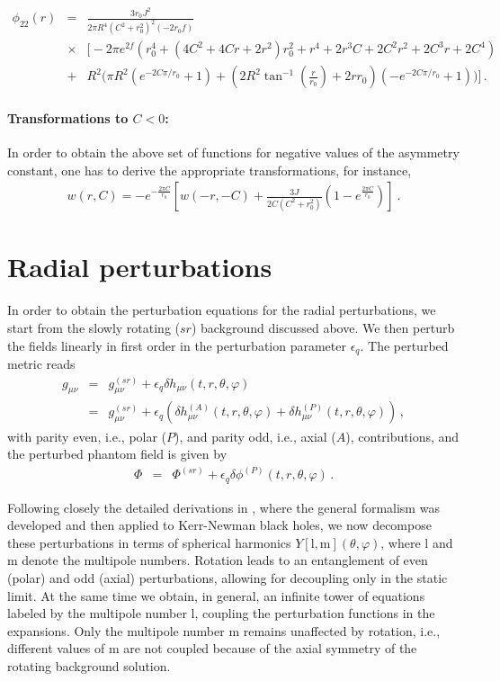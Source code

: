 \documentclass[aps,prd,12pt,superscriptaddress]{revtex4-2}
\begin{document}
\begin{eqnarray}
\phi_{22}(r) &=& \frac{3r_0J^2}{2 \pi
R^4 (C^2 + r_0^2)^2
(-2r_0f)} \nonumber\\
&\times&
\Big[ -2\pi e^{2f}
( r_0^4 + (4C^2 + 4Cr + 2r^2)r_0^2 + r^4 + 2r^3C + 2C^2r^2 + 2C^3r + 2C^4 )  \nonumber\\
&+& R^2 
\Big( 
 \pi R^2   (e^{-2C\pi/r_0} +1) 
+ (2R^2 \tan^{-1}(\frac{r}{r_0})  + 2rr_0)
(-e^{-2C\pi/r_0} +1)
\Big) \Big] \, .
\end{eqnarray}

\paragraph{Transformations to $C<0$:}
In order to obtain the above set of functions for negative values of the asymmetry constant, one has to derive the appropriate transformations, for instance,
\begin{eqnarray}
    w(r,C) = -e^{-\frac{2\pi C}{r_0}}
    \left[w(-r,-C) + \frac{3J}{2C(C^2+r_0^2)} (1-e^{\frac{2\pi C}{r_0}})\right] \ .
\end{eqnarray}


\section{Radial perturbations}

In order to obtain the perturbation equations for the radial perturbations, we start from the slowly rotating ($sr$) background discussed above.
We then perturb the fields linearly in first order in the perturbation parameter $\epsilon_q$.
The perturbed metric reads
\begin{eqnarray}
g_{\mu\nu} &=& g^{(sr)}_{\mu\nu} + \epsilon_q \delta h_{\mu\nu}(t,r,\theta,{\varphi}) \nonumber \\
 &=& g^{(sr)}_{\mu\nu} + \epsilon_q 
\left( \delta h^{(A)}_{\mu\nu}(t,r,\theta,{\varphi}) 
    +  \delta h^{(P)}_{\mu\nu}(t,r,\theta,{\varphi}) \right)
\, , 
\label{per_m}
\end{eqnarray}
with parity even, i.e., polar ($P$), and parity odd, i.e., axial ($A$), contributions, and the perturbed phantom field is given by
\begin{eqnarray}
\Phi &=& {\Phi}^{(sr)} + \epsilon_q \delta{\phi}^{(P)} (t,r,\theta,{\varphi})
\label{per_p}
\, .
\end{eqnarray}

Following closely the detailed derivations in \cite{Blazquez-Salcedo:2022eik}, where the general formalism was developed and then applied to Kerr-Newman black holes, we now decompose these perturbations in terms of spherical harmonics $Y[\mathrm{l},\mathrm{m}](\theta,{\varphi})$, where $\mathrm{l}$ and $\mathrm{m}$ denote the multipole numbers.
Rotation leads to an entanglement of even (polar) and odd (axial) perturbations, allowing for decoupling only in the static limit.
At the same time we obtain, in general, an infinite tower of equations labeled by the multipole number $\mathrm{l}$, coupling the perturbation functions in the expansions.
Only the multipole number $\mathrm{m}$ remains unaffected by rotation, i.e., different values of $\mathrm{m}$ are not coupled because of the axial symmetry of the rotating background solution.
\end{document}
